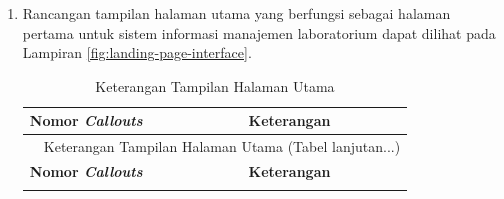 \begin{enumerate}
	\item Rancangan tampilan halaman utama yang berfungsi sebagai halaman pertama untuk sistem informasi manajemen laboratorium dapat dilihat pada Lampiran \ref{fig:landing-page-interface}.

	      {
	      \fontsize{10}{13}\selectfont
	      \begin{longtable}{p{4cm} p{9cm}}
		      \caption{Keterangan Tampilan Halaman Utama}                                                                                                                                                  \\
		      \hline
		      \textbf{Nomor \textit{Callouts}} & \textbf{Keterangan}                                                                                                                                       \\
		      \hline
		      \endfirsthead

		      \multicolumn{2}{c}{\normalsize\tablename\ \textbf{\thetable}\ {{Keterangan Tampilan Halaman Utama \space (Tabel lanjutan...)}}}                                                              \\
		      \hline
		      \textbf{Nomor \textit{Callouts}} & \textbf{Keterangan}                                                                                                                                       \\
		      \hline
		      \endhead

		      \hline
		      \endfoot


\end{longtable}}
\end{enumerate}
